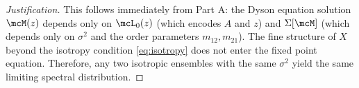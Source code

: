\begin{proof}[Justification]
This follows immediately from Part A: the Dyson equation solution $\mcM(z)$ depends only on $\mcL_0(z)$ (which encodes $A$ and $z$) and $\Sigma[\mcM]$ (which depends only on $\sigma^2$ and the order parameters $m_{12}, m_{21}$). The fine structure of $X$ beyond the isotropy condition \eqref{eq:isotropy} does not enter the fixed point equation. Therefore, any two isotropic ensembles with the same $\sigma^2$ yield the same limiting spectral distribution.
\end{proof}
